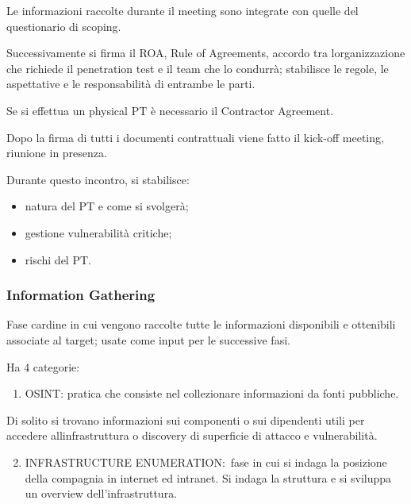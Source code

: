 \documentclass[
]{article}
\providecommand{\tightlist}{%
  \setlength{\itemsep}{0pt}\setlength{\parskip}{0pt}}
\begin{document}
{Le informazioni raccolte durante il meeting sono integrate con quelle
del questionario di scoping.}

{}

{}

{Successivamente si firma il }{ROA}{, Rule of Agreement}{s, }{accordo
tra l\textquotesingle organizzazione che richiede il penetration test e
il team che lo condurrà; stabilisce le regole, le aspettative e le
responsabilità di entrambe le parti.}

{}

{Se si effettua un physical PT è necessario il }{Contractor
Agreement}{.}

{}

{}

{Dopo la firma di tutti i documenti contrattuali viene fatto il
}{kick-off meeting}{, riunione in presenza. }

{Durante questo incontro, si stabilisce:}

\begin{itemize}
\tightlist
\item
  {natura del PT e come si svolgerà;}
\item
  {gestione vulnerabilità critiche;}
\item
  {rischi del PT.}
\end{itemize}

\subsubsection{\texorpdfstring{{Information
Gathering}}{Information Gathering}}\label{h.9vwbxy8wlby7}

{Fase cardine in cui vengono raccolte tutte le informazioni disponibili
e ottenibili associate al target; usate come input per le successive
fasi.}

{}

{Ha 4 categorie:}

\begin{enumerate}
\tightlist
\item
  {OSINT}{: pratica che consiste nel collezionare informazioni da fonti
  pubbliche.}
\end{enumerate}

{Di solito si trovano informazioni sui componenti o sui dipendenti utili
per accedere all\textquotesingle infrastruttura o discovery di
superficie di attacco e vulnerabilità.}

{}

\begin{enumerate}
\setcounter{enumi}{1}
\tightlist
\item
  {INFRASTRUCTURE ENUMERATION:}{~fase in cui si indaga la posizione
  della compagnia in internet ed intranet. Si indaga la struttura e si
  sviluppa un overview dell'infrastruttura. }
\end{enumerate}
\end{document}
